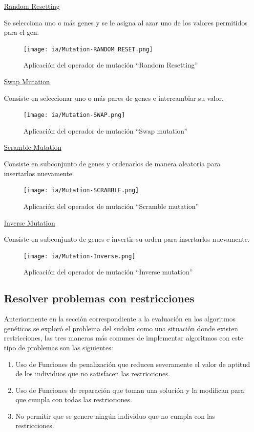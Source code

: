 \documentclass[11pt,fleqn]{book} %
\begin{document}
\underline{Random Resetting}

Se selecciona uno o más genes y se le asigna al azar uno de los valores permitidos para el gen.

\begin{figure}[ht]
\centering\texttt{[image: ia/Mutation-RANDOM RESET.png]}
\caption{Aplicación del operador de mutación “Random Resetting”}
\label{fig:Mutation-RANDOMRESET} 
\end{figure}

\underline{Swap Mutation}

Consiste en seleccionar uno o más pares de genes e intercambiar su valor.

\begin{figure}[ht]
\centering\texttt{[image: ia/Mutation-SWAP.png]}
\caption{Aplicación del operador de mutación “Swap mutation”}
\label{fig:Mutation-SWAP} 
\end{figure}

\underline{Scramble Mutation}

Consiste en subconjunto de genes y ordenarlos de manera aleatoria para insertarlos nuevamente.

\begin{figure}[ht!]
\centering\texttt{[image: ia/Mutation-SCRABBLE.png]}
\caption{Aplicación del operador de mutación “Scramble mutation”}
\label{fig:Mutation-SCRABBLE} 
\end{figure}

\underline{Inverse Mutation}

Consiste en subconjunto de genes e invertir su orden para insertarlos nuevamente.
\begin{figure}[ht!]
\centering\texttt{[image: ia/Mutation-Inverse.png]}
\caption{Aplicación del operador de mutación “Inverse mutation”}
\label{fig:Mutation-Inverse} 
\end{figure}

\subsection{Resolver problemas con restricciones} 

Anteriormente en la sección correspondiente a la evaluación en los algoritmos genéticos se exploró el problema del sudoku como una situación donde existen restricciones, las tres maneras más comunes de implementar algoritmos con este tipo de problemas son las siguientes:

\begin{enumerate}
\item Uso de Funciones de penalización que reducen severamente el valor de aptitud de los individuos que no satisfacen las restricciones.
\item Uso de Funciones de reparación que toman una solución y la modifican para que cumpla con todas las restricciones.
\item No permitir que se genere ningún individuo que no cumpla con las restricciones.
\end{enumerate}
\end{document}

